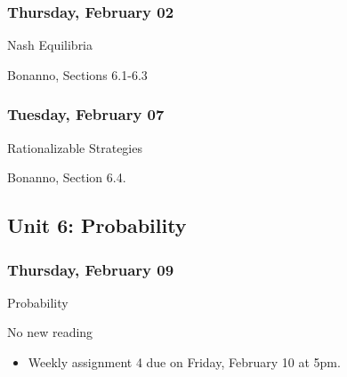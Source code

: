 \documentclass[
]{article}
\providecommand{\tightlist}{%
  \setlength{\itemsep}{0pt}\setlength{\parskip}{0pt}}
\begin{document}
\begin{multicols}{2}

\hypertarget{thursday-february-02}{%
\subsubsection{Thursday, February 02}\label{thursday-february-02}}

\begin{description}
\tightlist
\item[Topic]
Nash Equilibria
\item[Reading]
Bonanno, Sections 6.1-6.3
\end{description}

\hypertarget{tuesday-february-07}{%
\subsubsection{Tuesday, February 07}\label{tuesday-february-07}}

\begin{description}
\tightlist
\item[Topic]
Rationalizable Strategies
\item[Reading]
Bonanno, Section 6.4.
\end{description}

\end{multicols}

\hypertarget{unit-6-probability}{%
\subsection{Unit 6: Probability}\label{unit-6-probability}}

\hypertarget{thursday-february-09}{%
\subsubsection{Thursday, February 09}\label{thursday-february-09}}

\begin{description}
\tightlist
\item[Topic]
Probability
\item[Reading]
No new reading
\end{description}

\begin{itemize}
\tightlist
\item
  Weekly assignment 4 due on Friday, February 10 at 5pm.
\end{itemize}
\end{document}
